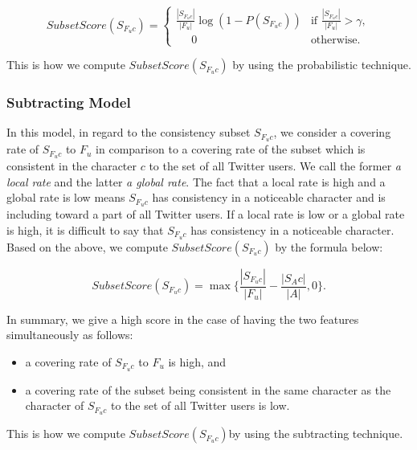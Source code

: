 \vspace{-1ex}
\[
  \displaystyle \mathit{SubsetScore}(S_{F_uc}) = \begin{cases}
    \displaystyle \frac{|S_{F_uc}|}{|F_u|} \log (1 - P(S_{F_uc})) &
    \mbox{if } \displaystyle \frac{|S_{F_uc}|}{|F_u|} > \gamma, \\
    \displaystyle \;\;\;\;\;0 & \mbox{otherwise.}
  \end{cases}
\]
\vspace{-2ex}

This is how we compute $\mathit{SubsetScore(S_{F_uc})}$ by using
the probabilistic technique.

\subsubsection{Subtracting Model}
\label{subsubsec:Subtracting}

In this model, in regard to the consistency subset $S_{F_uc}$, we
consider a covering rate of $S_{F_uc}$ to $F_u$ in comparison to a
covering rate of the subset which is consistent in the character $c$ to the set of
all Twitter users.  We call the former \emph{a local rate} and the
latter \emph{a global rate}.  The fact that a local rate is high and a
global rate is low means $S_{F_uc}$ has consistency in a noticeable
character and is including toward a part of all Twitter
users.  If a local rate is low or a global rate is high, it is difficult
to say that $S_{F_uc}$ has consistency in a noticeable character.  Based
on the above, we compute $\mathit{SubsetScore(S_{F_uc})}$ by the formula
below:

\vspace{-1ex}
\[
 \mathit{SubsetScore}(S_{F_uc}) = \max \{\frac{|S_{F_uc}|}{|F_u|} -
 \frac{|S_Ac|}{|A|}, 0\}.
\]
\vspace{-2ex}

In summary, we give a high score in the case of having the two features
simultaneously as follows:

\begin{itemize}
\item a covering rate of $S_{F_uc}$ to $F_u$ is high, and
\item a covering rate of the subset being consistent in the same
      character as the character of $S_{F_uc}$ to the set of all Twitter
      users is low.
\end{itemize}

This is how we compute $\mathit{SubsetScore(S_{F_uc})}$by using
the subtracting technique.

